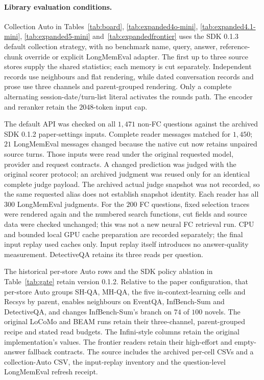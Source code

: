 \documentclass{article}
\begin{document}
\paragraph{Library evaluation conditions.} Collection Auto in Tables~\ref{tab:board}, \ref{tab:expanded4o-mini}, \ref{tab:expanded4.1-mini}, \ref{tab:expanded5-mini} and~\ref{tab:expandedfrontier} uses the SDK 0.1.3 default collection strategy, with no benchmark name, query, answer, reference-chunk override or explicit LongMemEval adapter. The first up to three source stores supply the shared statistics; each memory is cut separately. Independent records use neighbours and flat rendering, while dated conversation records and prose use three channels and parent-grouped rendering. Only a complete alternating session-date/turn-list literal activates the rounds path. The encoder and reranker retain the $2048$-token input cap.

The default API was checked on all $1{,}471$ non-FC questions against the archived SDK 0.1.2 paper-settings inputs. Complete reader messages matched for $1{,}450$; $21$ LongMemEval messages changed because the native cut now retains unpaired source turns. Those inputs were read under the original requested model, provider and request contracts. A changed prediction was judged with the original scorer protocol; an archived judgment was reused only for an identical complete judge payload. The archived actual judge snapshot was not recorded, so the same requested alias does not establish snapshot identity. Each reader has all $300$ LongMemEval judgments. For the $200$ FC questions, fixed selection traces were rendered again and the numbered search functions, cut fields and source data were checked unchanged; this was not a new neural FC retrieval run. CPU and bounded local GPU cache preparation are recorded separately; the final input replay used caches only. Input replay itself introduces no answer-quality measurement. DetectiveQA retains its three reads per question.

The historical per-store Auto rows and the SDK policy ablation in Table~\ref{tab:gate} retain version 0.1.2. Relative to the paper configuration, that per-store Auto groups SH-QA, MH-QA, the five in-context-learning cells and Recsys by parent, enables neighbours on EventQA, InfBench-Sum and DetectiveQA, and changes InfBench-Sum's branch on $74$ of $100$ novels. The original LoCoMo and BEAM runs retain their three-channel, parent-grouped recipe and stated read budgets. The Infini-style columns retain the original implementation's values. The frontier readers retain their high-effort and empty-answer fallback contracts. The source includes the archived per-cell CSVs and a collection-Auto CSV, the input-replay inventory and the question-level LongMemEval refresh receipt.
\end{document}
